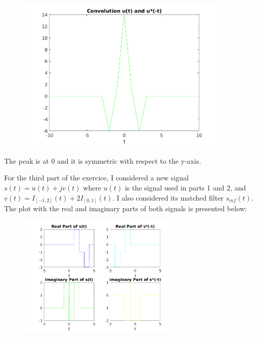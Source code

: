\documentclass[a4paper,11pt]{article}
\begin{document}
\begin{figure}[!hp]
    \begin{center}
      \includegraphics[width=0.9\textwidth]{images/exercice_3b.png}
    \end{center}
\end{figure}

The peak is at 0 and it is symmetric with respect to the y-axis.

\bigskip

For the third part of the exercice, I considered a new signal $s(t) = u(t) + jv(t)$ where $u(t)$ is the signal used in parts 1 and 2, and $v(t) = I_{[-1,2]}(t) + 2I_{[0,1]}(t)$. I also considered its matched filter $s_{mf}(t)$. The plot with the real and imaginary parts of both signals is presented below:

\newpage

\begin{figure}[!hp]
    \begin{center}
      \includegraphics[width=0.7\textwidth]{images/exercice_3c.png}
    \end{center}
\end{figure}
\end{document}
